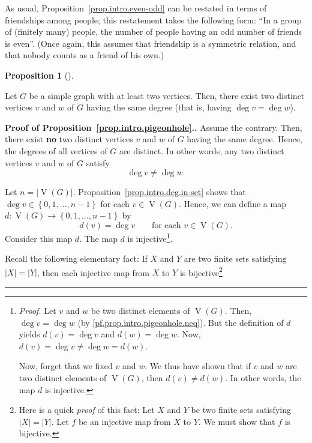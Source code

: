 \documentclass[numbers=enddot,12pt,final,onecolumn,notitlepage]{scrartcl}%
\theoremstyle{definition}
\newtheorem{prop}[theo]{Proposition}
\newenvironment{proposition}[1][]
{\begin{prop}[#1]\begin{leftbar}}
{\end{leftbar}\end{prop}}
\newenvironment{proof}[1][Proof]{\noindent\textbf{#1.} }{\ \rule{0.5em}{0.5em}}
\newcommand{\set}[1]{\left\{ #1 \right\}}
\newcommand{\abs}[1]{\left| #1 \right|}
\newcommand{\tup}[1]{\left( #1 \right)}
\newcommand{\verts}[1]{\operatorname{V}\left( #1 \right)}
\begin{document}
As usual, Proposition~\ref{prop.intro.even-odd} can be restated in
terms of friendships among people; this restatement takes the
following form: ``In a group of (finitely many) people, the number of
people having an odd number of friends is even''. (Once again, this
assumes that friendship is a symmetric relation, and that nobody
counts as a friend of his own.)

\begin{proposition} \label{prop.intro.pigeonhole}
Let $G$ be a simple graph with at least two vertices.
Then, there exist two distinct vertices $v$ and $w$ of $G$ having the
same degree (that is, having $\deg v = \deg w$).
\end{proposition}

\begin{proof}[Proof of Proposition~\ref{prop.intro.pigeonhole}.]
Assume the contrary. Then, there exist \textbf{no} two distinct
vertices $v$ and $w$ of $G$ having the same degree. Hence, the degrees
of all vertices of $G$ are distinct. In other words, any two distinct
vertices $v$ and $w$ of $G$ satisfy
\begin{equation}
\deg v \neq \deg w .
\label{pf.prop.intro.pigeonhole.neq}
\end{equation}

Let $n = \abs{\verts{G}}$. Proposition~\ref{prop.intro.deg.in-set}
shows that $\deg v \in \set{0, 1, \ldots, n-1}$ for each
$v \in \verts{G}$. Hence, we can define a map
$d : \verts{G} \to \set{0, 1, \ldots, n-1}$ by
\[
d\tup{v} = \deg v \qquad \text{for each } v \in \verts{G} .
\]
Consider this map $d$. The map $d$ is
injective\footnote{\textit{Proof.} Let $v$ and $w$ be two distinct
elements of $\verts{G}$. Then, $\deg v = \deg w$
(by \eqref{pf.prop.intro.pigeonhole.neq}). But
the definition of $d$ yields
$d\tup{v} = \deg v$ and $d\tup{w} = \deg w$. Now,
$d\tup{v} = \deg v \neq \deg w = d\tup{w}$.

Now, forget that we fixed $v$ and $w$. We thus have shown that if $v$
and $w$ are two distinct elements of $\verts{G}$, then
$d\tup{v} \neq d\tup{w}$. In other words, the map $d$ is injective.}.

Recall the following elementary fact: If $X$ and $Y$ are two finite
sets satisfying $\abs{X} = \abs{Y}$, then each injective map from $X$
to $Y$ is bijective\footnote{Here is a quick \textit{proof} of this
fact: Let $X$ and $Y$ be two finite sets satisfying $\abs{X} =
\abs{Y}$. Let $f$ be an injective map from $X$ to $Y$. We must show
that $f$ is bijective.

}
\end{proof}
\end{document}

